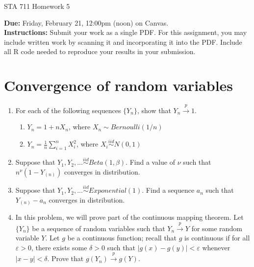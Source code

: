 \documentclass[11pt]{article}
\begin{document}
\begin{center}
\Large
STA 711 Homework 5\\
\normalsize
\vspace{5mm}
\end{center}

\noindent \textbf{Due:} Friday, February 21, 12:00pm (noon) on Canvas.\\ 

\noindent \textbf{Instructions:} Submit your work as a single PDF. For this assignment, you may include written work by scanning it and incorporating it into the PDF. Include all R code needed to reproduce your results in your submission.

\section*{Convergence of random variables}

\begin{enumerate}
\item For each of the following sequences $\{Y_n\}$, show that $Y_n \overset{p}{\to} 1$.
\begin{enumerate}
\item $Y_n = 1 + n X_n$, where $X_n \sim Bernoulli(1/n)$

\item $Y_n = \frac{1}{n} \sum \limits_{i=1}^n X_i^2$, where $X_i \overset{iid}{\sim} N(0, 1)$
\end{enumerate}

\item Suppose that $Y_1, Y_2,... \overset{iid}{\sim} Beta(1, \beta)$. Find a value of $\nu$ such that $n^{\nu}(1 - Y_{(n)})$ converges in distribution.

\item Suppose that $Y_1, Y_2,... \overset{iid}{\sim} Exponential(1)$. Find a sequence $a_n$ such that $Y_{(n)} - a_n$ converges in distribution.

\item In this problem, we will prove part of the continuous mapping theorem. Let $\{Y_n\}$ be a sequence of random variables such that $Y_n \overset{p}{\to} Y$ for some random variable $Y$. Let $g$ be a continuous function; recall that $g$ is continuous if for all $\varepsilon > 0$, there exists some $\delta > 0$ such that $|g(x) - g(y)| < \varepsilon$ whenever $|x - y| < \delta$. Prove that $g(Y_n) \overset{p}{\to} g(Y)$.

\end{enumerate}
\end{document}
